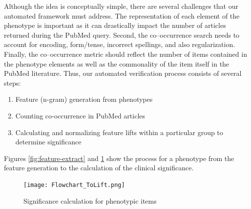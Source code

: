 \documentclass{sig-alternate}
\begin{document}
Although the idea is conceptually simple, there are several challenges that our automated framework must address.
The representation of each element of the phenotype is important as it can drastically impact the number of articles returned during the PubMed query.
Second, the co--occurrence search needs to account for encoding, form/tense, incorrect spellings, and also regularization.
Finally, the co--occurrence metric should reflect the number of items contained in the phenotype elements as well as the commonality of the item itself in the PubMed literature.
Thus, our automated verification process consists of several steps:
\begin{enumerate}
\item Feature (n-gram) generation from phenotypes
\item Counting co-occurrence in PubMed articles
\item Calculating and normalizing feature lifts within a particular group to determine significance
\end{enumerate}
Figures \ref{fig:feature-extract} and \ref{fig:sig-calc} show the process for a phenotype from the feature generation to the calculation of the clinical significance.

\begin{figure} [t]
\centering
\texttt{[image: Flowchart\_ToLift.png]}
\caption{Significance calculation for phenotypic items}
\label{fig:sig-calc}
\end{figure}


\end{document}
